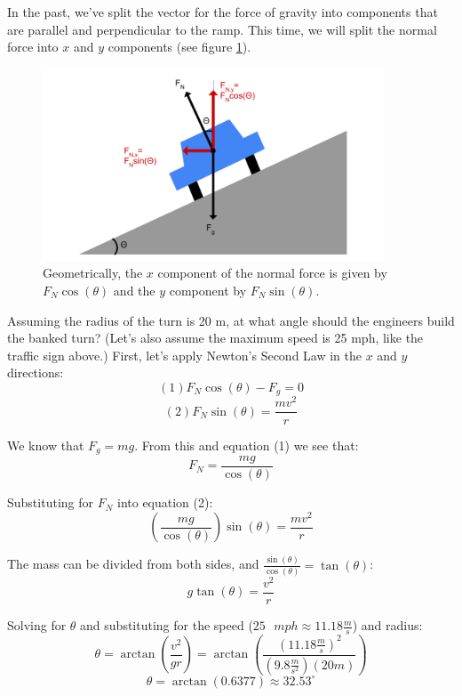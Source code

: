 In the past, we've split the vector for the force of gravity into components that are parallel and perpendicular to the ramp. This time, we will split the normal force into $x$ and $y$ components (see figure \ref{fig:banked_component}). 

\begin{figure}[htbp]
\centering
\includegraphics[width=4in]{banked_component.png}
\caption{Geometrically, the $x$ component of the normal force is given by $F_N \cos{\left( \theta \right)}$ and the $y$ component by $F_N \sin{ \left( \theta \right)}$.}
\label{fig:banked_component}
\end{figure}

Assuming the radius of the turn is 20 m, at what angle should the engineers build the banked turn? (Let's also assume the maximum speed is 25 mph, like the traffic sign above.) First, let's apply Newton's Second Law in the $x$ and $y$ directions:
$$\left( 1 \right) F_N \cos{ \left( \theta \right) } - F_g = 0$$
$$\left( 2 \right) F_N \sin{ \left( \theta \right) } = \frac{mv^2}{r}$$

We know that $F_g = mg$. From this and equation (1) we see that:
$$F_N = \frac{mg}{\cos{ \left( \theta \right)}}$$

Substituting for $F_N$ into equation (2):
$$\left( \frac{mg}{\cos{ \left( \theta \right)}} \right) \sin{ \left( \theta \right)} = \frac{mv^2}{r}$$

The mass can be divided from both sides, and $\frac{\sin{ \left( \theta \right)}}{\cos{ \left( \theta \right)}} = \tan{ \left( \theta \right)}$:
$$g \tan{ \left( \theta \right)} = \frac{v^2}{r}$$

Solving for $\theta$ and substituting for the speed ($25 \text{ }mph \approx 11.18 \frac{m}{s}$) and radius:
$$\theta = \arctan{ \left( \frac{v^2}{gr} \right)} = \arctan{ \left( \frac{\left( 11.18 \frac{m}{s} \right)^2}{\left( 9.8 \frac{m}{s^2} \right) \left( 20 m \right)} \right)}$$
$$\theta = \arctan{ \left( 0.6377 \right) } \approx 32.53 ^{\circ}$$


